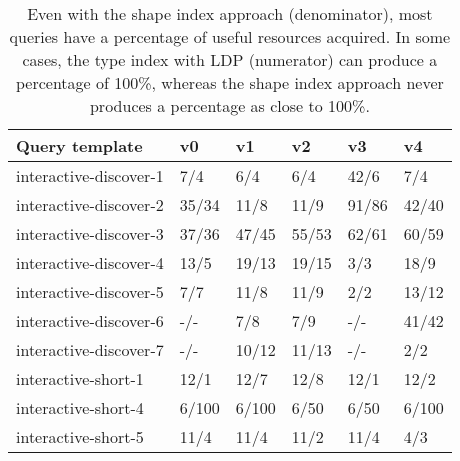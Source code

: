 \begin{table}
	\begin{center}
		\begin{tabular}{|l|l|l|l|l|l|}
			\hline
			Query template & v0 & v1 & v2 & v3 & v4 \\
			\hline
			interactive-discover-1 & 7/4 & 6/4 & 6/4 & 42/6 & 7/4 \\
			\hline
			interactive-discover-2 & 35/34 & 11/8 & 11/9 & 91/86 & 42/40 \\
			\hline
			interactive-discover-3 & 37/36 & 47/45 & 55/53 & 62/61 & 60/59 \\
			\hline
			interactive-discover-4 & 13/5 & 19/13 & 19/15 & 3/3 & 18/9 \\
			\hline
			interactive-discover-5 & 7/7 & 11/8 & 11/9 & 2/2 & 13/12 \\
			\hline
			interactive-discover-6 & -/- & 7/8 & 7/9 & -/- & 41/42 \\
			\hline
			interactive-discover-7 & -/- & 10/12 & 11/13 & -/- & 2/2 \\
			\hline
			interactive-short-1 & 12/1 & 12/7 & 12/8 & 12/1 & 12/2 \\
			\hline
			interactive-short-4 & 6/100 & 6/100 & 6/50 & 6/50 & 6/100 \\
			\hline
			interactive-short-5 & 11/4 & 11/4 & 11/2 & 11/4 & 4/3 \\
			\hline
		\end{tabular}
	\end{center}
	\caption{Even with the shape index approach (denominator), most queries have a percentage of useful resources acquired. In some cases, the type index with LDP (numerator) can produce a percentage of 100\%, whereas the shape index approach never produces a percentage as close to 100\%.}
	\label{tab:ratioUsefulResources}
\end{table}
